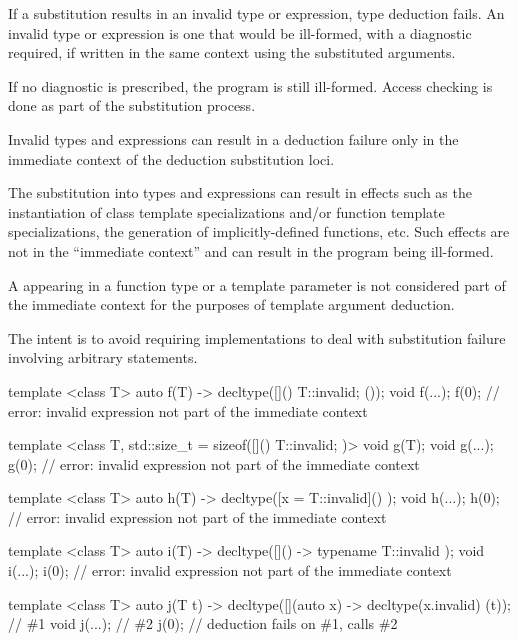 \pnum
If a substitution results in an invalid type or expression, type deduction fails. An
invalid type or expression is one that would be ill-formed, with a diagnostic
required, if written in the same context using the substituted arguments.
\begin{note}
If no
diagnostic is prescribed, the program is still ill-formed. Access checking is done
as part of the substitution
process.
\end{note}
Invalid types and expressions can result in a deduction failure
only in the immediate context of the deduction substitution loci.
\begin{note}
The substitution into types and expressions can result
in effects such as the instantiation of class template specializations and/or
function template specializations, the generation of implicitly-defined functions,
etc. Such effects are not in the ``immediate context'' and can result in the
program being ill-formed.
\end{note}

\pnum
A  appearing in a function type
or a template parameter is not considered part of the immediate context
for the purposes of template argument deduction.
\begin{note}
The intent is to avoid requiring implementations to deal with
substitution failure involving arbitrary statements.
\begin{example}
\begin{codeblock}
template <class T>
  auto f(T) -> decltype([]() { T::invalid; } ());
void f(...);
f(0);               // error: invalid expression not part of the immediate context

template <class T, std::size_t = sizeof([]() { T::invalid; })>
  void g(T);
void g(...);
g(0);               // error: invalid expression not part of the immediate context

template <class T>
  auto h(T) -> decltype([x = T::invalid]() { });
void h(...);
h(0);               // error: invalid expression not part of the immediate context

template <class T>
  auto i(T) -> decltype([]() -> typename T::invalid { });
void i(...);
i(0);               // error: invalid expression not part of the immediate context

template <class T>
  auto j(T t) -> decltype([](auto x) -> decltype(x.invalid) { } (t));   // \#1
void j(...);                                                            // \#2
j(0);               // deduction fails on \#1, calls \#2
\end{codeblock}
\end{example}
\end{note}


